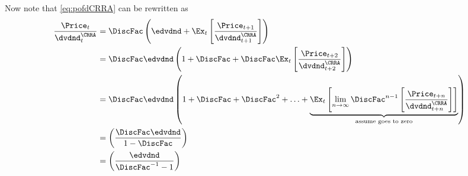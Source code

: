 \documentclass{handout}
\begin{document}
Now note that \eqref{eq:pofdCRRA} can be rewritten as
\begin{equation}\begin{gathered}\begin{aligned}
  \frac{\Price_{t}}{\dvdnd_{t}^{\CRRA}}          & =  \DiscFac \left( \edvdnd + \Ex_{t}\left[\frac{\Price_{t+1}}{\dvdnd_{t+1}^{\CRRA}}\right] \right) \notag
\\ & =  \DiscFac \edvdnd \left(1 + \DiscFac + \DiscFac \Ex_{t}\left[\frac{\Price_{t+2}}{\dvdnd_{t+2}^{\CRRA}}\right]\right) \notag
\\ & =  \DiscFac \edvdnd \left(1 + \DiscFac  + \DiscFac^{2} + \ldots + \underbrace{\Ex_{t} \left[\lim_{n\rightarrow \infty}\DiscFac^{n-1}\left[\frac{\Price_{t+n}}{\dvdnd_{t+n}^{\CRRA}}\right]\right]}_{\text{assume goes to zero}}\right) 
\\ & =  \left(\frac{\DiscFac \edvdnd}{1-\DiscFac}\right)
\\ & =  \left(\frac{\edvdnd}{\DiscFac^{-1}-1}\right) \label{eq:PtCRRA}
\end{aligned}\end{gathered}\end{equation}
\end{document}
